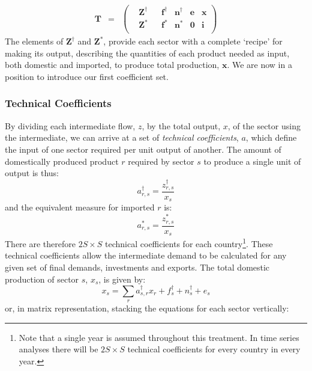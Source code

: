 \documentclass[a4paper]{article}
\begin{document}
\begin{equation}\label{eqn:Tvectorised}
\begin{array}{rcc}
\boldsymbol{T} & = & 
\left(
	\begin{array}{ccccccc}
 & \boldsymbol{Z}^{\dag} & & \boldsymbol{f}^\dag & \boldsymbol{n}^\dag & \boldsymbol{e} & \boldsymbol{x} \\
 & \boldsymbol{Z}^* & & \boldsymbol{f}^* & \boldsymbol{n}^* & \boldsymbol{0} & \boldsymbol{i} \\
	\end{array} 
\right)
\end{array}
\end{equation}
The elements of $\boldsymbol{Z}^\dagger$ and $\boldsymbol{Z}^*$, provide each sector with a complete `recipe' for making its output, describing the quantities of each product needed as input, both domestic and imported, to produce total production, $\boldsymbol{x}$. 
We are now in a position to introduce our first coefficient set.

\subsubsection*{Technical Coefficients}\label{sec:techcoeffs}
By dividing each intermediate flow, $z$, by the total output, $x$, of the sector using the intermediate, we can arrive at a set of \textit{technical coefficients}, $a$, which define the input of one sector required per unit output of another.
The amount of domestically produced product $r$ required by sector $s$ to produce a single unit of output is thus:
\begin{equation}\label{eq:adagger}
a_{r,s}^\dagger = \frac{z^\dagger_{r,s}}{x_s}
\end{equation}
and the equivalent measure for imported $r$ is:
\begin{equation}\label{eq:astar}
a_{r,s}^* = \frac{z^*_{r,s}}{x_s}
\end{equation}
There are therefore $2S \times S$ technical coefficients for each country\footnote{Note that a single year is assumed throughout this treatment.
In time series analyses there will be $2S \times S$ technical coefficients for every country in every year.}.
These technical coefficients allow the intermediate demand to be calculated for any given set of final demands, investments and exports. The total domestic production of sector $s$, $x_s$, is given by:
$$
x_s = \sum_r{a^\dagger_{s,r}x_r} + f^\dagger_s + n^\dagger_s + e_s 
$$
or, in matrix representation, stacking the equations for each sector vertically:
\end{document}
